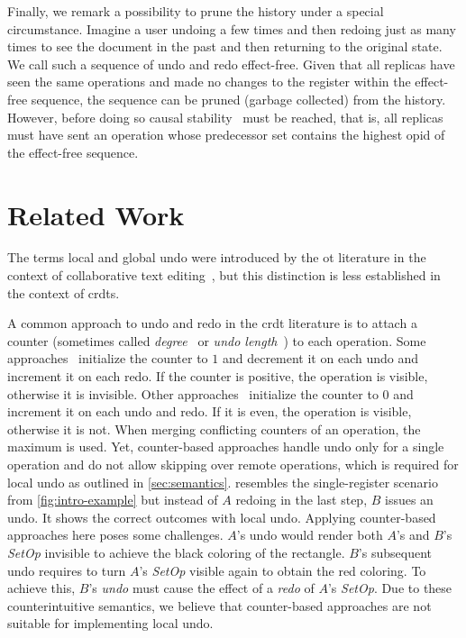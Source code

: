 \documentclass[sigplan,natbib=false,review]{acmart}
\newcommand{\setopkind}{\textit{SetOp}}
\begin{document}
Finally, we remark a possibility to prune the history under a special circumstance.
Imagine a user undoing a few times and then redoing just as many times
to see the document in the past and then returning to the original state.
We call such a sequence of undo and redo effect-free.
Given that all replicas have seen the same operations and made no
changes to the register within the effect-free sequence,
the sequence can be pruned (garbage collected) from the history.
However, before doing so causal stability~\cite{baquero2017pure}
must be reached, that is, all
replicas must have sent an operation whose predecessor set contains the
highest \gls*{opid} of the effect-free sequence.

\section{Related Work}\label{sec:related-work}

The terms local and global undo were introduced by the \acrlong{ot}
literature in the context of collaborative text
editing~\cite{sun2000undo,ressel1999reducing, abowd1992giving},
but this distinction is less established in the context of \glspl{crdt}.

A common approach to undo and redo in the \gls{crdt} literature is
to attach a counter
(sometimes called \emph{degree}~\cite{Weiss2010LogootUndo} or
\emph{undo length}~\cite{Brattli2021undo,Yu2019undo}) to each operation.
Some approaches~\cite{Weiss2010LogootUndo,Martin2010xml} initialize the
counter to $1$ and decrement it on each undo and increment it on each redo.
If the counter is positive, the operation is visible,
otherwise it is invisible.
Other approaches~\cite{Brattli2021undo,Yu2019undo} initialize the counter
to $0$ and increment it on each undo and redo.
If it is even, the operation is visible, otherwise it is not.
When merging conflicting counters of an operation, the maximum is used.
Yet, counter-based approaches handle undo only for a single operation
and do not allow skipping over remote operations, which is required
for local undo as outlined in \cref{sec:semantics}.
 resembles the single-register scenario from
\cref{fig:intro-example} but instead of $A$ redoing in the last step,
$B$ issues an undo. It shows the correct outcomes with local undo.
Applying counter-based approaches here poses some challenges.
$A$'s undo would render both $A$'s and $B$'s \setopkind{} invisible to
achieve the black coloring of the rectangle.
$B$'s subsequent undo requires to turn $A$'s \setopkind{} visible again to
obtain the red coloring.
To achieve this, $B$'s \emph{undo} must cause the effect of a \emph{redo}
of $A$'s \setopkind{}.
Due to these counterintuitive semantics,
we believe that counter-based approaches are not suitable
for implementing local undo.
\end{document}
